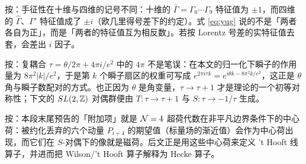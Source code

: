 \begin{yizhu}[易错点]
按：手征性在十维与四维的记号不同：十维的 $\bar\Gamma=\Gamma_0\cdots\Gamma_9$ 特征值为 $\pm1$，而四维的 $\hat\Gamma$、$\Gamma'$ 特征值成了 $\pm i$（欧几里得号差下的约定）。式 \eqref{eq:yug} 说的不是「两者各自为正」，而是「两者的特征值互为相反数」。若按 Lorentz 号差的实特征值去套，会差出 $i$ 因子。
\end{yizhu}

\begin{yizhu}[物理图像]
按：复耦合 $\tau=\theta/2\pi+4\pi i/e^2$ 中的 $4\pi$ 不是笔误：在本文的归一化下瞬子的作用量为 $8\pi^2|k|/e^2$，于是第 $k$ 个瞬子扇区的权重可写成 $e^{2\pi i\tau k}=e^{i\theta k-8\pi^2k/e^2}$，这正是 $\theta$ 角与瞬子数配对的方式。也正因为 $\theta$ 是角变量，$\tau\to\tau+1$ 才是理论的一个初等对称性；下文的 $SL(2,\Bbb{Z})$ 对偶群便由 $T:\tau\to\tau+1$ 与 $S:\tau\to-1/\tau$ 生成。
\end{yizhu}

\begin{yizhu}[含糊点拨]
按：本段末尾预告的「附加项」就是 ${\EUN}=4$ 超荷代数在非平凡边界条件下的中心荷：被约化丢弃的六个动量 $P_{i+4}$ 的期望值（标量场的渐近值）会作为中心荷出现，而它们在 $S$-对偶下的像就是磁荷。后文正是用这些中心荷来定义 't Hooft 线算子，并进而把 Wilson/'t Hooft 算子解释为 Hecke 算子。
\end{yizhu}
